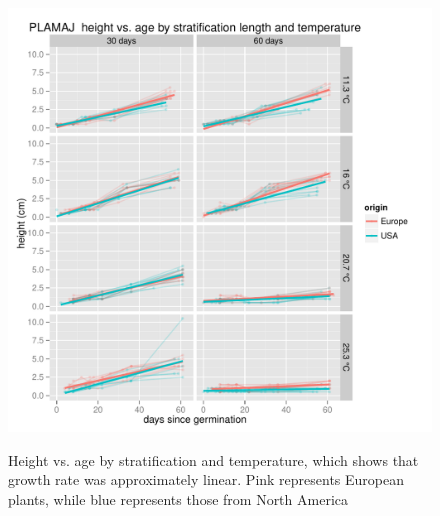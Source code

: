\documentclass[12pt]{article}\usepackage[]{graphicx}\usepackage[]{color}
\begin{document}
\begin{figure}[H]
  {\includegraphics[scale=.5, page=5, trim=0cm 0cm 0cm 1.2cm, clip=TRUE]{supplement.pdf}}
  \caption{Height vs. age by stratification and temperature, which shows that growth rate was approximately linear.  Pink represents European plants, while blue represents those from  North America \label{fig:lmgr}}
\end{figure}
\end{document}
